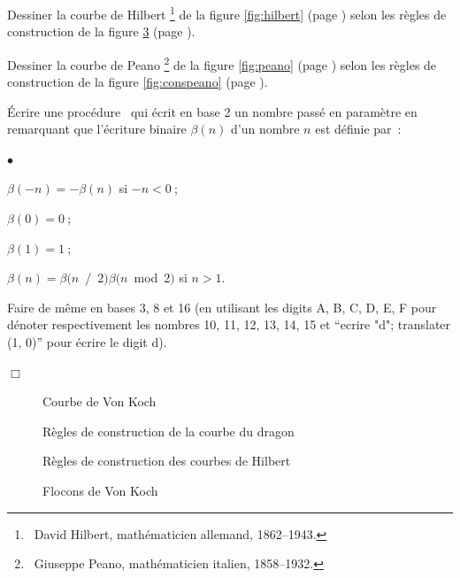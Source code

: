 \begin{exercice}
{\tiret Dessiner la courbe de Hilbert\/%
\footnote{\ David Hilbert, mathématicien allemand, 1862--1943.}
de la figure \ref{fig:hilbert}  (page \pageref{fig:hilbert}) selon les règles de construction de
la figure \ref{fig:conshilbert}  (page \pageref{fig:conshilbert}).

\tiret Dessiner la courbe de Peano\/%
\footnote{\ Giuseppe Peano, mathématicien italien, 1858--1932.}
 de la figure \ref{fig:peano}  (page \pageref{fig:peano}) selon les règles de construction de
la figure \ref{fig:conspeano}  (page \pageref{fig:conspeano}).

\tiret Écrire une procédure \ocaml\ qui écrit en base 2 un nombre passé en paramètre
en remarquant que l'écriture binaire $\beta(n)$ d'un nombre $n$ est définie par~:
\begin{list}{$\scriptscriptstyle\bullet$}{
}
  \item $\beta(-n) = -\beta(n)$ si $-n < 0$$\:$;
  \item $\beta(0) = 0$$\:$;
 \item $\beta(1) = 1$$\:$;
 \item $\beta(n) = \beta(n $\ {\idt /}\ $ 2) \beta(n$\ {\mcl mod}\ $2)$ si $n > 1$.
\end{list}
Faire de même en bases 3, 8 et 16 (en utilisant les digits {\idt A}, {\idt B}, {\idt C}, {\idt D},
{\idt E}, {\idt F} pour dénoter respectivement les nombres 10, 11, 12, 13, 14, 15 et 
``{\idt ecrire} {\cha "d"}{\idt ; translater (1, 0)}'' 
pour écrire le digit \mbox{\cha d}).

\noindent $\Box$}\end{exercice}
\begin{figure}[htbp]
 \caption{Courbe de Von Koch}\label{fig:segvonkoch}
\end{figure}
\begin{figure}[htbp]
 \caption{Règles de construction de la courbe du dragon}\label{fig:consdragon}
\end{figure}
\begin{figure}[htbp]
 \caption{Règles de construction des courbes de Hilbert}\label{fig:conshilbert}
\end{figure}
\begin{figure}[htbp]
 \caption{Flocons de Von Koch}\label{fig:flocvonkoch}
\end{figure}
